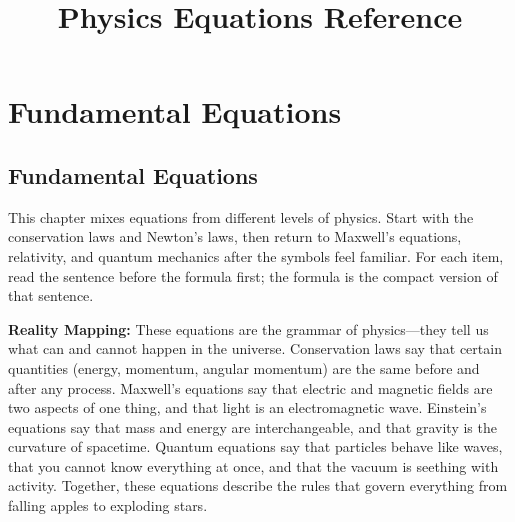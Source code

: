 \documentclass[11pt,openright]{book}
\title{Physics Equations Reference}
\author{}
\date{}
\begin{document}
\frontmatter
\maketitle
\tableofcontents
\mainmatter

\part{Fundamental Equations}

\chapter{Fundamental Equations}

This chapter mixes equations from different levels of physics. Start with the conservation laws and Newton's laws, then return to Maxwell's equations, relativity, and quantum mechanics after the symbols feel familiar. For each item, read the sentence before the formula first; the formula is the compact version of that sentence.

\textbf{Reality Mapping:} These equations are the grammar of physics---they tell us what can and cannot happen in the universe. Conservation laws say that certain quantities (energy, momentum, angular momentum) are the same before and after any process. Maxwell's equations say that electric and magnetic fields are two aspects of one thing, and that light is an electromagnetic wave. Einstein's equations say that mass and energy are interchangeable, and that gravity is the curvature of spacetime. Quantum equations say that particles behave like waves, that you cannot know everything at once, and that the vacuum is seething with activity. Together, these equations describe the rules that govern everything from falling apples to exploding stars.
\end{document}
